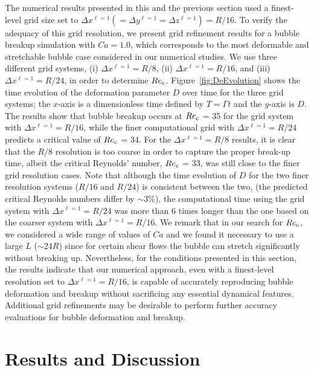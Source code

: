 \documentclass[%
 reprint,
 showkeys,
 amsmath,amssymb,
 aps,
 prfluids,
 onecolumn
]{revtex4-2}
\begin{document}
The numerical results presented in this and the previous section used a
finest-level grid size set to $\Delta x^{\ell=1}(= \Delta y^{\ell=1}= \Delta
z^{\ell=1})=R/16$. To verify the adequacy of this grid resolution, we present
grid refinement results for a bubble breakup simulation with $Ca=1.0$, which
corresponds to the most deformable and stretchable bubble case considered in
our numerical studies. We use three different grid systems, 
(i) $\Delta x^{\ell=1}=R/8$,
(ii) $\Delta x^{\ell=1}=R/16$,
and 
(iii) $\Delta x^{\ell=1}=R/24$, in order to determine
$Re_{\rm c}$.  Figure~\ref{fig:DeEvolution} shows the time evolution of the
deformation parameter {\color{red} $D$} over time for the three grid systems; 
the $x$-axis is
a dimensionless time defined by $T=\mathit{\Gamma} t$ 
and the $y$-axis is {\color{red} $D$}.
The results show that bubble breakup occurs at $Re_{\rm c}$ = 35 for the grid system
with $\Delta x^{\ell=1}=R/16$, while the finer computational grid with $\Delta
x^{\ell=1}=R/24$ predicts a critical value of $Re_{\rm c}$ = 34.  
For the $\Delta x^{\ell=1}=R/8$ results, it is clear that the $R/8$ resolution is too
coarse in order to capture the proper break-up time, albeit the critical
Reynolds' number, $Re_{\rm c}$ = 33, was still close to the finer grid resolution
cases.
Note that although
the time evolution of {\color{red} $D$} for the two finer resolution
systems ($R/16$ and $R/24$) is consistent between the two,
(the predicted critical Reynolds numbers differ by $\sim 3\%$), the
computational time using the grid system with $\Delta x^{\ell=1}=R/24$ was more
than 6 times longer than the one based on the coarser system with $\Delta
x^{\ell=1}=R/16$.  We remark that in our search for $Re_{\rm c}$, we considered a
wide range of values of $Ca$ and we found it necessary to use a large $L$
($\sim 24R$) since for certain shear flows the bubble can stretch significantly
without breaking up.  Nevertheless, for the conditions presented in this
section, the results indicate that our numerical approach, even with a
finest-level resolution set to $\Delta x^{\ell=1}=R/16$, is capable of
accurately reproducing bubble deformation and breakup without sacrificing any
essential dynamical features.
{\color{red} Additional grid refinements may be desirable to perform further 
accuracy evaluations for bubble deformation and breakup.}

\section{Results and Discussion}
\end{document}
